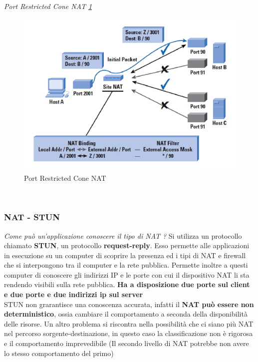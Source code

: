 \documentclass[12pt]{article}
\begin{document}
			 	\textit{Port Restricted Cone NAT \ref{fig:11}}\\
			 	\begin{figure}[h!]
			 		\centering
			 		\includegraphics[scale=0.60]{img/port.PNG}
			 		\caption{Port Restricted Cone NAT \label{fig:11}}
			 	\end{figure}\\
			 	
			 \subsubsection{NAT - STUN}
			 	\textit{Come può un'applicazione conoscere il tipo di NAT ?}\newline
			 	Si utilizza un protocollo chiamato \textbf{STUN}, un protocollo \textbf{request-reply}. Esso permette alle applicazioni in esecuzione su un computer di scoprire la presenza ed i tipi di NAT e firewall che si interpongono tra il computer e la rete pubblica. Permette inoltre a questi computer di conoscere gli indirizzi IP e le porte con cui il dispositivo NAT li sta rendendo visibili sulla rete pubblica. \textbf{Ha a disposizione due porte sul client e due porte e due indirizzi ip sul server}\\
			 	STUN non grarantisce una conoscenza accurata, infatti il \textbf{NAT può essere non deterministico}, ossia cambiare il comportamento a seconda della disponibilità delle risorse. Un altro problema si riscontra nella possibilità che ci siano più NAT nel percorso sorgente-destinazione, in questo caso la classificazione non è rigorosa e il comportamento imprevedibile (Il secondo livello di NAT potrebbe non avere lo stesso comportamento del primo)
\end{document}
